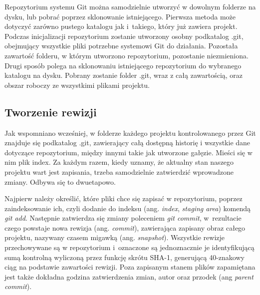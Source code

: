\documentclass[11pt,a4paper,polish,thesis]{dcsbook}
\begin{document}
	Repozytorium systemu Git można samodzielnie utworzyć w dowolnym folderze na dysku, lub pobrać poprzez sklonowanie istniejącego. Pierwsza metoda może dotyczyć zarówno pustego katalogu jak i~takiego, który już zawiera projekt. Podczas inicjalizacji repozytorium zostanie utworzony osobny podkatalog .git, obejmujący wszystkie pliki potrzebne systemowi Git do działania. Pozostała zawartość folderu, w którym utworzono repozytorium, pozostanie niezmieniona. Drugi sposób polega na sklonowaniu istniejącego repozytorium do wybranego katalogu na dysku. Pobrany zostanie folder .git, wraz z całą zawartością, oraz obszar roboczy ze wszystkimi plikami projektu.

	\subsection{Tworzenie rewizji}

	Jak wspomniano wcześniej, w folderze każdego projektu kontrolowanego przez Git znajduje się podkatalog .git, zawierający całą dostępną historię i wszystkie dane dotyczące repozytorium, między innymi takie jak utworzone gałęzie. Mieści się w nim plik index. Za każdym razem, kiedy uznamy, że aktualny stan naszego projektu wart jest zapisania, trzeba samodzielnie zatwierdzić wprowadzone zmiany. Odbywa się to dwuetapowo.

	Najpierw należy określić, które pliki chce się zapisać w repozytorium, poprzez zaindeksowanie ich, czyli dodanie do indeksu (ang. \textit{index}, \textit{staging area}) komendą \textit{git add}. Następnie zatwierdza się zmiany poleceniem \textit{git commit}, w~rezultacie czego powstaje nowa rewizja (ang. \textit{commit}), zawierająca zapisany obraz całego projektu, nazywany czasem migawką (ang. \textit{snapshot}). Wszystkie rewizje przechowywane są w repozytorium i~oznaczone są jednoznacznie je identyfikującą sumą kontrolną wyliczoną przez funkcję skrótu \mbox{SHA-1}, generującą 40-znakowy ciąg na podstawie zawartości rewizji. Poza zapisanym stanem plików zapamiętana jest także dokładna godzina zatwierdzenia zmian, autor oraz przodek (ang \textit{parent commit}).
\end{document}
